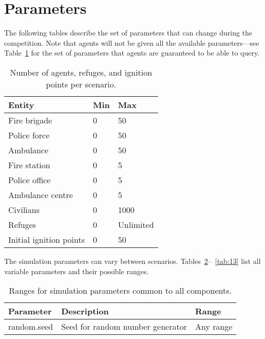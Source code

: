 \documentclass{article}
\begin{document}
\section{Parameters}
\label{sec:parameters}
The following tables describe the set of parameters that can change during the competition. Note that agents will not be given all the available parameters---see Table~\ref{tab:1} for the set of parameters that agents are guaranteed to be able to query.
\begin{table}[htb]
\caption{Number of agents, refuges, and ignition points per scenario.}
\label{tab:1}
\centering
\begin{tabular}{lll}
  \hline
  \textbf{Entity}         & \textbf{Min}  & \textbf{Max}\\
  \hline
  Fire brigade            & 0             & 50\\
  Police force            & 0             & 50\\
  Ambulance               & 0             & 50\\
  \hline
  Fire station            & 0             & 5\\
  Police office           & 0             & 5\\
  Ambulance centre        & 0             & 5\\
  \hline
  Civilians               & 0             & 1000\\
  \hline
  Refuges                 & 0             & Unlimited\\
  Initial ignition points & 0             & 50\\
  \hline
\end{tabular}
\end{table}

The simulation parameters can vary between scenarios. Tables~\ref{tab:2}--~\ref{tab:13} list all variable parameters and their possible ranges.
\begin{table}[htb]
\caption{Ranges for simulation parameters common to all components.}
\label{tab:2}
\centering
\begin{tabular}{lll}
  \hline
  \textbf{Parameter} & \textbf{Description}              & \textbf{Range}\\
  \hline
  random.seed        & Seed for random number generator  & Any range\\
  \hline
\end{tabular}
\end{table}
\end{document}
